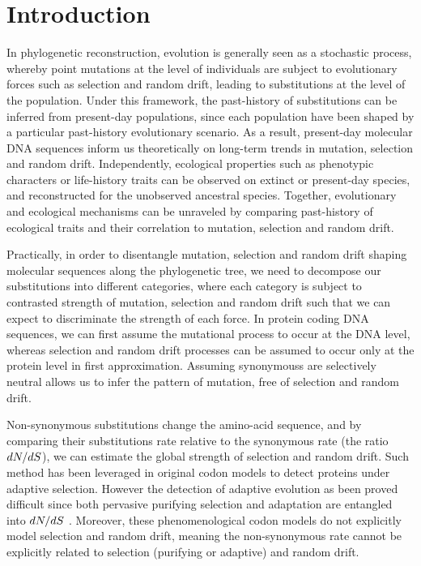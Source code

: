 

\section{Introduction}
\label{sec:Introduction}
In phylogenetic reconstruction, evolution is generally seen as a stochastic process, whereby point mutations at the level of individuals are subject to evolutionary forces such as selection and random drift, leading to \glspl{substitution} at the level of the population.
Under this framework, the past-history of \glspl{substitution} can be inferred from present-day populations, since each population have been shaped by a particular past-history evolutionary scenario.
As a result, present-day molecular \acrshort{DNA} sequences inform us theoretically on long-term trends in mutation, selection and random drift.
Independently, ecological properties such as phenotypic characters or life-history traits can be observed on extinct or present-day species, and reconstructed for the unobserved ancestral species.
Together, evolutionary and ecological mechanisms can be unraveled by comparing past-history of ecological traits and their correlation to mutation, selection and random drift.

Practically, in order to disentangle mutation, selection and random drift shaping molecular sequences along the phylogenetic tree, we need to decompose our \glspl{substitution} into different categories, where each category is subject to contrasted strength of mutation, selection and random drift such that we can expect to discriminate the strength of each force.
In protein coding \acrshort{DNA} sequences, we can first assume the mutational process to occur at the \acrshort{DNA} level, whereas selection and random drift processes can be assumed to occur only at the protein level in first approximation.
Assuming \glspl{synonymous} are selectively \gls{neutral} allows us to infer the pattern of mutation, free of selection and random drift.

Non-synonymous \glspl{substitution} change the amino-acid sequence, and by comparing their \glspl{substitution} rate relative to the \gls{synonymous} rate (the ratio $dN/dS$), we can estimate the global strength of selection and random drift.
Such method has been leveraged in original \gls{codon} models \citep{Muse1994,Goldman1994} to detect proteins under adaptive selection.
However the detection of adaptive evolution as been proved difficult since both pervasive purifying selection and adaptation are entangled into $dN/dS$ \citep{Yang2000}.
Moreover, these phenomenological \gls{codon} models do not explicitly model selection and random drift, meaning the \gls{non-synonymous} rate cannot be explicitly related to selection (purifying or adaptive) and random drift.

